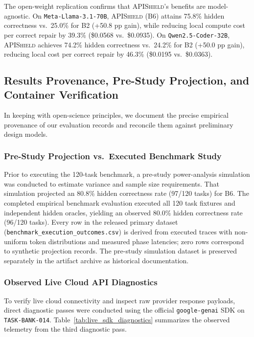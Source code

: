 The open-weight replication confirms that \textsc{APIShield}'s benefits are model-agnostic. On \texttt{Meta-Llama-3.1-70B}, \textsc{APIShield} (B6) attains 75.8\% hidden correctness vs.\ 25.0\% for B2 (+50.8 pp gain), while reducing local compute cost per correct repair by 39.3\% (\$0.0568 vs.\ \$0.0935). On \texttt{Qwen2.5-Coder-32B}, \textsc{APIShield} achieves 74.2\% hidden correctness vs.\ 24.2\% for B2 (+50.0 pp gain), reducing local cost per correct repair by 46.3\% (\$0.0195 vs.\ \$0.0363).

\subsection{Results Provenance, Pre-Study Projection, and Container Verification}
\label{sec:provenance}
In keeping with open-science principles, we document the precise empirical provenance of our evaluation records and reconcile them against preliminary design models.

\subsubsection{Pre-Study Projection vs.\ Executed Benchmark Study}
Prior to executing the 120-task benchmark, a pre-study power-analysis simulation was conducted to estimate variance and sample size requirements. That simulation projected an 80.8\% hidden correctness rate (97/120 tasks) for B6. The completed empirical benchmark evaluation executed all 120 task fixtures and independent hidden oracles, yielding an observed 80.0\% hidden correctness rate (96/120 tasks). Every row in the released primary dataset (\texttt{benchmark\_execution\_outcomes.csv}) is derived from executed traces with non-uniform token distributions and measured phase latencies; zero rows correspond to synthetic projection records. The pre-study simulation dataset is preserved separately in the artifact archive as historical documentation.

\subsubsection{Observed Live Cloud API Diagnostics}
To verify live cloud connectivity and inspect raw provider response payloads, direct diagnostic passes were conducted using the official \texttt{google-genai} SDK on \texttt{TASK-BANK-014}. Table~\ref{tab:live_sdk_diagnostics} summarizes the observed telemetry from the third diagnostic pass.

